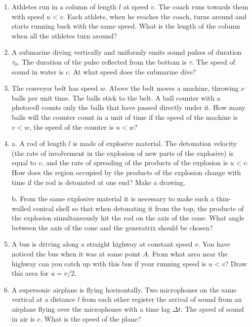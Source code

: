 \documentclass{article}
\begin{document}
\begin{enumerate}[label=1.1.\arabic*]
\item Athletes run in a column of length $l$ at speed $v$. The coach runs towards them with speed $u < v$. Each athlete, when he reaches the coach, turns around and starts running back with the same speed. What is the length of the column when all the athletes turn around?

\item A submarine diving vertically and uniformly emits sound pulses of duration $\tau_0$. The duration of the pulse reflected from the bottom is $\tau$. The speed of sound in water is $c$. At what speed does the submarine dive?

\item The conveyor belt has speed $w$. Above the belt moves a machine, throwing $\nu$ balls per unit time. The balls stick to the belt. A ball counter with a photocell counts only the balls that have passed directly under it. How many balls will the counter count in a unit of time if the speed of the machine is $v < w$, the speed of the counter is  $u < w$?


\item a. A rod of length $l$ is made of explosive material. The detonation velocity (the rate of involvement in the explosion of new parts of the explosive) is equal to $v$, and the rate of spreading of the products of the explosion is $u < v$. How does the region occupied by the products of the explosion change with time if the rod is detonated at one end? Make a drawing.

b. From the same explosive material it is necessary to make such a thin-walled conical shell so that when detonating it from the top, the products of the explosion simultaneously hit the rod on the axis of the cone. What angle between the axis of the cone and the generatrix should be chosen?

\item A bus is driving along a straight highway at constant speed $v$. You have noticed the bus when it was at some point $A$. From what area near the highway can you catch up with this bus if your running speed is $u < v$? Draw this area for $u = v/2$.

\item A supersonic airplane is flying horizontally. Two microphones on the same vertical at a distance $l$ from each other register the arrival of sound from an airplane flying over the microphones with a time lag $\Delta t$. The speed of sound in air is $c$. What is the speed of the plane?


\end{enumerate}
\end{document}
